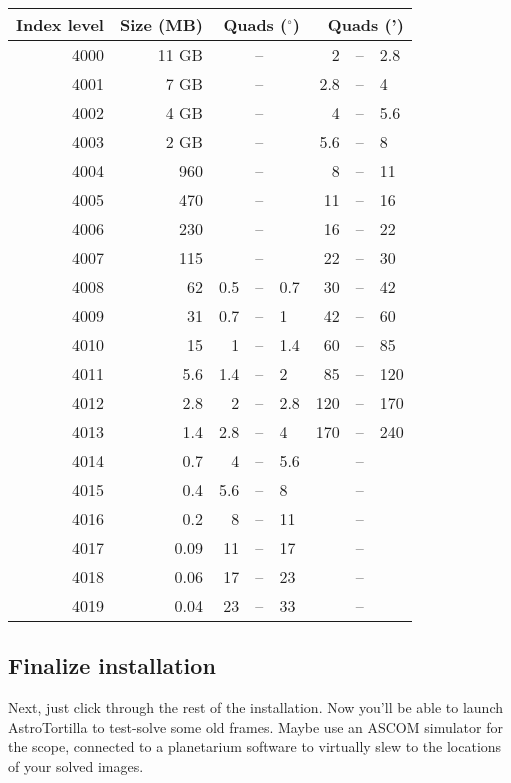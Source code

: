 \documentclass[english]{article}
\begin{document}
\begin{table}[!h]
\centering
\begin{tabular}{r r r @{ } c @{ } l r @{ } c @{ } l} \toprule
Index level 	& Size (MB) & \multicolumn{3}{r}{Quads ($^\circ$)} & \multicolumn{3}{r}{Quads (')} \\ \midrule
4000 & 11 GB 	&  	&--& 		& 2 	&--&	2.8\\
4001 & 7 GB 	&  	&--&  	& 2.8	&--&	4\\
4002 & 4 GB 	&  	&--&  	& 4 	&--&	5.6\\
4003 & 2	GB 	&  	&--&  	& 5.6	&--&	8\\
4004 & 960  	&  	&--&  	& 8 	&--&	11\\
4005 & 470  	&  	&--&  	& 11 	&--&	16\\
4006 & 230  	&  	&--&  	& 16 	&--&	22\\
4007 & 115  	&    	&--&  	& 22 	&--&	30\\
4008 & 62  		& 0.5 &--& 0.7	& 30 	&--&	42\\
4009 & 31  		& 0.7 &--& 1	& 42 	&--&	60\\
4010 & 15  		& 1 	&--& 1.4	& 60 	&--&	85\\
4011 & 5.6  	& 1.4	&--& 2	& 85 	&--&	120\\
4012 & 2.8  	& 2 	&--& 2.8	& 120 &--&	170\\
4013 & 1.4  	& 2.8	&--& 4 	& 170	&--&	240\\
4014 & 0.7  	& 4	&--& 5.6	&		&--&		\\
4015 & 0.4  	& 5.6	&--& 8 	&		&--&		\\
4016 & 0.2  	& 8	&--& 11	&		&--&		\\
4017 & 0.09  	& 11	&--& 17	&		&--&		\\
4018 & 0.06  	& 17	&--& 23	&		&--&		\\
4019 & 0.04  	& 23	&--& 33	&		&--&		\\ \bottomrule
\end{tabular}
\end{table}

\subsection{Finalize installation}

Next, just click through the rest of the installation. Now you'll be able to launch AstroTortilla to test-solve some old frames. Maybe use an ASCOM simulator for the scope, connected to a planetarium software to virtually slew to the locations of your solved images.
\end{document}
